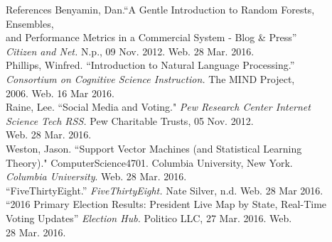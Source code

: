 \documentclass[final]{beamer}
\newlength{\onecolwid}
\begin{document}
\begin{frame}[t]
\begin{columns}[t]
\begin{column}{\onecolwid}
\begin{block}{References}
\footnotesize
\noindent Benyamin, Dan.``A Gentle Introduction to Random Forests, Ensembles, \\
\hspace{1cm}and Performance Metrics in a Commercial System - Blog \& Press'' \\ 
\hspace{1cm}\textit{Citizen and Net.} N.p., 09 Nov. 2012. Web. 28 Mar. 2016. \\
Phillips, Winfred.  ``Introduction to Natural Language Processing.'' \\
\hspace{1cm}\textit{Consortium on Cognitive Science Instruction.} The MIND Project,\\
\hspace{1cm}2006.  Web.  16 Mar 2016. \\
Raine, Lee. ``Social Media and Voting." \textit{Pew Research Center Internet} \\
\hspace{1cm}\textit{Science Tech RSS.} Pew Charitable Trusts, 05 Nov. 2012. \\
\hspace{1cm}Web. 28 Mar. 2016. \\
Weston, Jason. ``Support Vector Machines (and Statistical Learning \\
\hspace{1cm}Theory)." ComputerScience4701. Columbia University, New York. \\
\hspace{1cm}\textit{Columbia University}. Web. 28 Mar. 2016.\\
``FiveThirtyEight.'' \textit{FiveThirtyEight.} Nate Silver, n.d. Web.  28 Mar 2016. \\
``2016 Primary Election Results: President Live Map by State, Real-Time \\
\hspace{1cm}Voting Updates'' \textit{Election Hub.}
Politico LLC, 27 Mar. 2016.  Web.  \\
\hspace{1cm}28 Mar. 2016. \\

	
\end{block}




\end{column}
\end{columns}
\end{frame}
\end{document}
